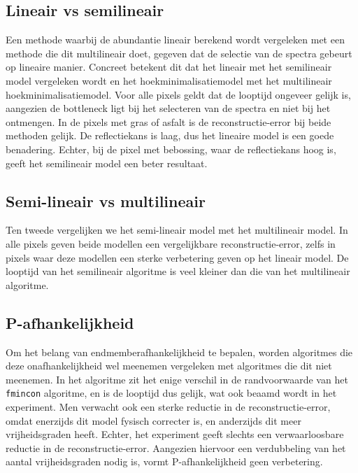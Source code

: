 \documentclass[12pt]{report}
\begin{document}
\subsection{Lineair vs semilineair}

Een methode waarbij de abundantie lineair berekend wordt vergeleken met een methode die dit multilineair doet, gegeven dat de selectie van de spectra gebeurt op lineaire manier. Concreet betekent dit dat het lineair met het semilineair model vergeleken wordt en het hoekminimalisatiemodel met het multilineair hoekminimalisatiemodel. Voor alle pixels geldt dat de looptijd ongeveer gelijk is, aangezien de bottleneck ligt bij het selecteren van de spectra en niet bij het ontmengen. In de pixels met gras of asfalt is de reconstructie-error bij beide methoden gelijk. De reflectiekans is laag, dus het lineaire model is een goede benadering. Echter, bij de pixel met bebossing, waar de reflectiekans hoog is, geeft het semilineair model een beter resultaat.


\subsection{Semi-lineair vs multilineair}

Ten tweede vergelijken we het semi-lineair model met het multilineair model. In alle pixels geven beide modellen een vergelijkbare reconstructie-error, zelfs in pixels waar deze modellen een sterke verbetering geven op het lineair model. De looptijd van het semilineair algoritme is veel kleiner dan die van het multilineair algoritme. 

\subsection{P-afhankelijkheid}

Om het belang van endmemberafhankelijkheid te bepalen, worden algoritmes die deze onafhankelijkheid wel meenemen vergeleken met algoritmes die dit niet meenemen. In het algoritme zit het enige verschil in de randvoorwaarde van het \texttt{fmincon} algoritme, en is de looptijd dus gelijk, wat ook beaamd wordt in het experiment. Men verwacht ook een sterke reductie in de reconstructie-error, omdat enerzijds dit model fysisch correcter is, en anderzijds dit meer vrijheidsgraden heeft. Echter, het experiment geeft slechts een verwaarloosbare reductie in de reconstructie-error. Aangezien hiervoor een verdubbeling van het aantal vrijheidsgraden nodig is, vormt P-afhankelijkheid geen verbetering.
\end{document}
